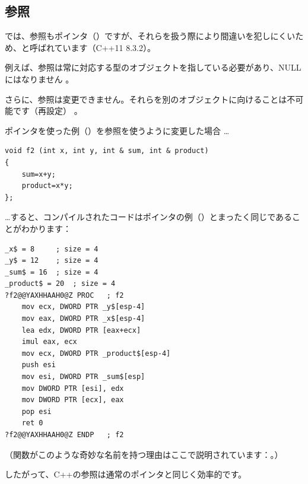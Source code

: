 \subsection{参照}
\label{cpp_references}

\Cpp では、参照もポインタ（）ですが、それらを扱う際により間違いを犯しにくいため、と呼ばれています（C++11 8.3.2）。%

例えば、参照は常に対応する型のオブジェクトを指している必要があり、NULLにはなりません
。

さらに、参照は変更できません。それらを別のオブジェクトに向けることは不可能です（再設定）
。

ポインタを使った例（）を参照を使うように変更した場合 \dots

\begin{lstlisting}[style=customc]
void f2 (int x, int y, int & sum, int & product)
{
	sum=x+y;
	product=x*y;
};
\end{lstlisting}

\dots すると、コンパイルされたコードはポインタの例（）とまったく同じであることがわかります：

\begin{lstlisting}[caption=\Optimizing MSVC 2010,style=customasmx86]
_x$ = 8		; size = 4
_y$ = 12	; size = 4
_sum$ = 16	; size = 4
_product$ = 20	; size = 4
?f2@@YAXHHAAH0@Z PROC	; f2
	mov	ecx, DWORD PTR _y$[esp-4]
	mov	eax, DWORD PTR _x$[esp-4]
	lea	edx, DWORD PTR [eax+ecx]
	imul eax, ecx
	mov ecx, DWORD PTR _product$[esp-4]
	push esi
	mov	esi, DWORD PTR _sum$[esp]
	mov	DWORD PTR [esi], edx
	mov	DWORD PTR [ecx], eax
	pop	esi
	ret	0
?f2@@YAXHHAAH0@Z ENDP	; f2
\end{lstlisting}

（\Cpp 関数がこのような奇妙な名前を持つ理由はここで説明されています：。）

したがって、C++の参照は通常のポインタと同じく効率的です。